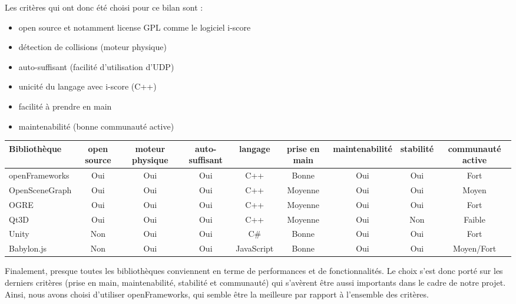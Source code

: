 Les critères qui ont donc été choisi pour ce bilan sont : 
\begin{itemize}
\item open source et notamment license GPL comme le logiciel i-score 
\item détection de collisions (moteur physique)
\item auto-suffisant (facilité d'utilisation d'UDP)
\item unicité du langage avec i-score (C++)
\item facilité à prendre en main
\item maintenabilité (bonne communauté active)
\end{itemize} 
 

\newpage
\begin{landscape}
\hspace{-4.5cm} 
\begin{tabular}{l|c|c|c|c|c|c|c|c}
Bibliothèque & open source & moteur physique & auto-suffisant & langage & prise en main & maintenabilité & stabilité & communauté active\\
\hline
openFrameworks & Oui & Oui & Oui & C++ & Bonne & Oui & Oui & Fort\\
OpenSceneGraph & Oui & Oui & Oui & C++ & Moyenne & Oui & Oui & Moyen\\ 
OGRE & Oui & Oui & Oui & C++ & Moyenne & Oui & Oui & Fort\\
Qt3D & Oui & Oui & Oui & C++ & Moyenne & Oui & Non & Faible\\
Unity & Non & Oui & Oui & C\# & Bonne & Oui & Oui & Fort\\
Babylon.js  & Non & Oui & Oui & JavaScript & Bonne & Oui & Oui & Moyen/Fort
\end{tabular}
\end{landscape}

Finalement, presque toutes les bibliothèques conviennent en terme de performances et de fonctionnalités. Le choix s'est donc porté sur les derniers critères (prise en main, maintenabilité, stabilité et communauté) qui s'avèrent être aussi importants dans le cadre de notre projet. Ainsi, nous avons choisi d'utiliser openFrameworks, qui semble être la meilleure par rapport à l'ensemble des critères.  
